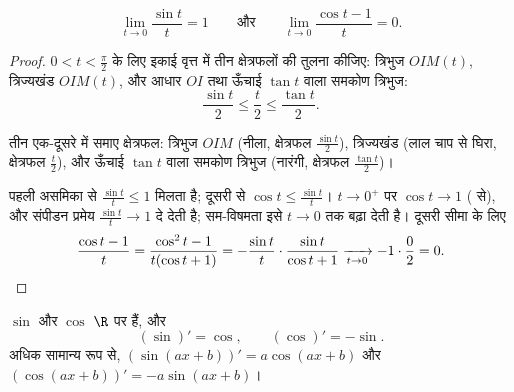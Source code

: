 \begin{lemma}[मूलभूत सीमा]\label{lem:g12:trigo:sinxx}
\[
\lim_{t \to 0} \frac{\sin t}{t} = 1
\qquad\text{और}\qquad
\lim_{t \to 0} \frac{\cos t - 1}{t} = 0 .
\]
\end{lemma}

\begin{proof}
$0 < t < \frac{\pi}{2}$ के लिए इकाई वृत्त में तीन क्षेत्रफलों की तुलना कीजिए: त्रिभुज $OIM(t)$,
त्रिज्यखंड $OIM(t)$, और आधार $OI$ तथा ऊँचाई $\tan t$ वाला समकोण त्रिभुज:
\[
\frac{\sin t}{2} \leq \frac{t}{2} \leq \frac{\tan t}{2}.
\]

\begin{omfigure}

{\small तीन एक-दूसरे में समाए क्षेत्रफल: त्रिभुज $OIM$ (नीला, क्षेत्रफल $\frac{\sin t}{2}$),
त्रिज्यखंड (लाल चाप से घिरा, क्षेत्रफल $\frac{t}{2}$), और ऊँचाई $\tan t$ वाला समकोण
त्रिभुज (नारंगी, क्षेत्रफल $\frac{\tan t}{2}$)।}
\end{omfigure}

पहली असमिका से $\frac{\sin t}{t} \leq 1$ मिलता है; दूसरी से $\cos t \leq \frac{\sin t}{t}$। $t \to 0^+$ पर $\cos t \to 1$ ( से), और
संपीडन प्रमेय $\frac{\sin t}{t} \to 1$ दे देती है; सम-विषमता इसे $t \to 0$ तक बढ़ा देती है। दूसरी सीमा
के लिए
\[
\frac{\cos t - 1}{t} = \frac{\cos^2 t - 1}{t(\cos t + 1)}
= -\frac{\sin t}{t}\cdot\frac{\sin t}{\cos t + 1}
\xrightarrow[t\to0]{} -1 \cdot \frac{0}{2} = 0. \qedhere
\]
\end{proof}

\begin{theorem}[ज्या और कोज्या के अवकलज]\label{thm:g12:trigo:derivatives}
 $\sin$ और $\cos$ $\R$ पर  हैं, और
\[
(\sin)' = \cos, \qquad (\cos)' = -\sin .
\]
अधिक सामान्य रूप से, $(\sin(ax+b))' = a\cos(ax+b)$ और $(\cos(ax+b))' = -a\sin(ax+b)$।
\end{theorem}

